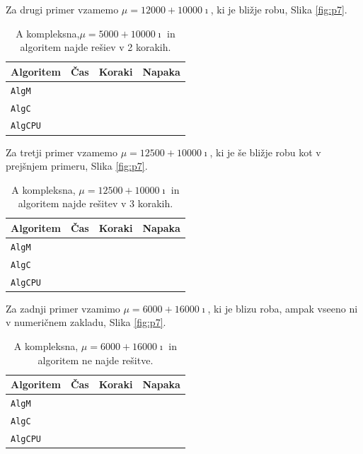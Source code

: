 \documentclass[12pt,a4paper]{amsart}
\theoremstyle{definition}
\theoremstyle{plain}
\begin{document}
Za drugi primer vzamemo $\mu = 12000+10000\imath$, ki je bližje robu, Slika \ref{fig:p7}.

\begin{table}[H]
\begin{tabular}{|l|l|c|r|}
\hline
Algoritem & Čas & Koraki & Napaka\\
\hline
\hline
\verb+AlgM+ & & & \\
\hline
\verb+AlgC+ & & & \\
\hline
\verb+AlgCPU+ & & & \\
\hline
\end{tabular}
\caption{A kompleksna,$\mu = 5000+10000\imath$ in algoritem najde rešiev v 2 korakih.}
\label{t8}
\end{table}

Za tretji primer vzamemo $\mu = 12500+10000\imath$, ki je še bližje robu kot v prejšnjem primeru, Slika \ref{fig:p7}.


\begin{table}[H]
\begin{tabular}{|l|l|c|r|}
\hline
Algoritem & Čas & Koraki & Napaka\\
\hline
\hline
\verb+AlgM+ & & & \\
\hline
\verb+AlgC+ & & & \\
\hline
\verb+AlgCPU+ & & & \\
\hline
\end{tabular}
\caption{A kompleksna, $\mu = 12500+10000\imath$ in algoritem najde rešitev v 3 korakih.}
\label{t9}
\end{table}

Za zadnji primer vzamimo $\mu = 6000+16000\imath$, ki je blizu roba, ampak vseeno ni v numeričnem zakladu, Slika \ref{fig:p7}.


\begin{table}[H]
\begin{tabular}{|l|l|c|r|}
\hline
Algoritem & Čas & Koraki & Napaka\\
\hline
\hline
\verb+AlgM+ & & & \\
\hline
\verb+AlgC+ & & & \\
\hline
\verb+AlgCPU+ & & & \\
\hline
\end{tabular}
\caption{A kompleksna, $\mu = 6000+16000\imath$ in algoritem ne najde rešitve.}
\label{t10}
\end{table}
\end{document}
